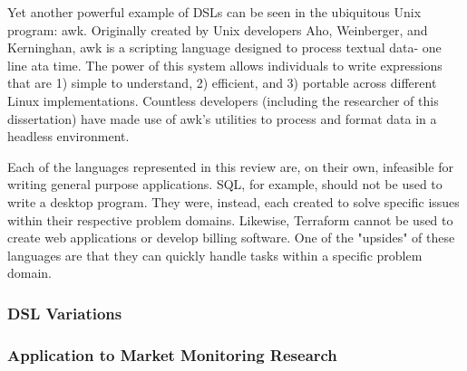 Yet another powerful example of DSLs can be seen in the ubiquitous Unix program: awk. Originally created by Unix developers Aho, Weinberger, and Kerninghan, awk is a scripting language designed to process textual data- one line ata time. The power of this system allows individuals to write expressions that are 1) simple to understand, 2) efficient, and 3) portable across different Linux implementations. Countless developers (including the researcher of this dissertation) have made use of awk's utilities to process and format data in a headless environment.

Each of the languages represented in this review are, on their own, infeasible for writing general purpose applications. SQL, for example, should not be used to write a desktop program. They were, instead, each created to solve specific issues within their respective problem domains. Likewise, Terraform cannot be used to create web applications or develop billing software. One of the "upsides" of these languages are that they can quickly handle tasks within a specific problem domain. 

\subsubsection{DSL Variations}

\subsubsection{Application to Market Monitoring Research}